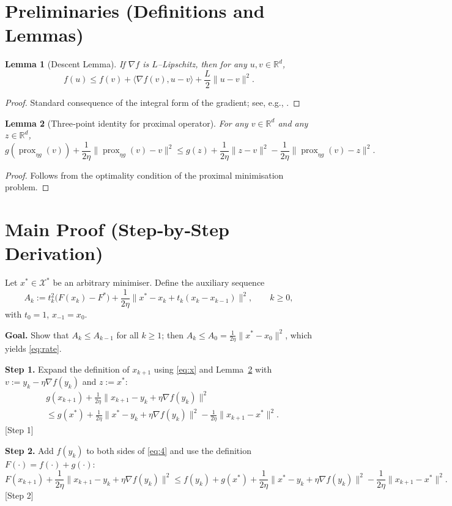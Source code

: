 \documentclass{article}
\newtheorem{lemma}{Lemma}
\newcommand{\prox}{\operatorname{prox}}
\newcommand{\R}{\mathbb{R}}
\begin{document}
\newpage
\section*{Preliminaries (Definitions and Lemmas)}
\begin{lemma}[Descent Lemma]\label{lem:descent}
If $\nabla f$ is $L$–Lipschitz, then for any $u,v\in\R^{d}$,
\[
f(u)\le f(v)+\langle\nabla f(v),u-v\rangle+\frac{L}{2}\|u-v\|^{2}.
\tag{2}
\]
\end{lemma}
\begin{proof}
Standard consequence of the integral form of the gradient; see, e.g.,
\cite{Nesterov2004}.
\end{proof}

\begin{lemma}[Three‑point identity for proximal operator]\label{lem:prox}
For any $v\in\R^{d}$ and any $z\in\R^{d}$,
\[
g(\prox_{\eta g}(v))+\frac{1}{2\eta}\bigl\|\prox_{\eta g}(v)-v\bigr\|^{2}
\le g(z)+\frac{1}{2\eta}\bigl\|z-v\bigr\|^{2}
-\frac{1}{2\eta}\bigl\|\prox_{\eta g}(v)-z\bigr\|^{2}.
\tag{3}
\]
\end{lemma}
\begin{proof}
Follows from the optimality condition of the proximal minimisation problem.
\end{proof}

\section*{Main Proof (Step‑by‑Step Derivation)}
Let $x^{*}\in\mathcal{X}^{*}$ be an arbitrary minimiser.
Define the auxiliary sequence
\[
A_k:=t_k^{2}\bigl(F(x_k)-F^{*}\bigr)+\frac{1}{2\eta}\|x^{*}-x_k+t_k(x_k-x_{k-1})\|^{2},
\qquad k\ge0,
\]
with $t_0=1$, $x_{-1}=x_0$.

\noindent\textbf{Goal.} Show that $A_{k}\le A_{k-1}$ for all $k\ge1$; then
$A_k\le A_0= \frac{1}{2\eta}\|x^{*}-x_0\|^{2}$, which yields \eqref{eq:rate}.

\bigskip
\noindent\textbf{Step 1.} Expand the definition of $x_{k+1}$ using \eqref{eq:x} and Lemma~\ref{lem:prox} with
$v:=y_k-\eta\nabla f(y_k)$ and $z:=x^{*}$:
\[
\begin{aligned}
&g(x_{k+1})+\frac{1}{2\eta}\|x_{k+1}-y_k+\eta\nabla f(y_k)\|^{2}\\
&\le g(x^{*})+\frac{1}{2\eta}\|x^{*}-y_k+\eta\nabla f(y_k)\|^{2}
-\frac{1}{2\eta}\|x_{k+1}-x^{*}\|^{2}. \tag{4}
\end{aligned}
\]
[Step 1]

\noindent\textbf{Step 2.} Add $f(y_k)$ to both sides of \eqref{eq:4} and use the
definition $F(\cdot)=f(\cdot)+g(\cdot)$:
\[
F(x_{k+1})+\frac{1}{2\eta}\|x_{k+1}-y_k+\eta\nabla f(y_k)\|^{2}
\le f(y_k)+g(x^{*})+\frac{1}{2\eta}\|x^{*}-y_k+\eta\nabla f(y_k)\|^{2}
-\frac{1}{2\eta}\|x_{k+1}-x^{*}\|^{2}. \tag{5}
\]
[Step 2]
\end{document}
